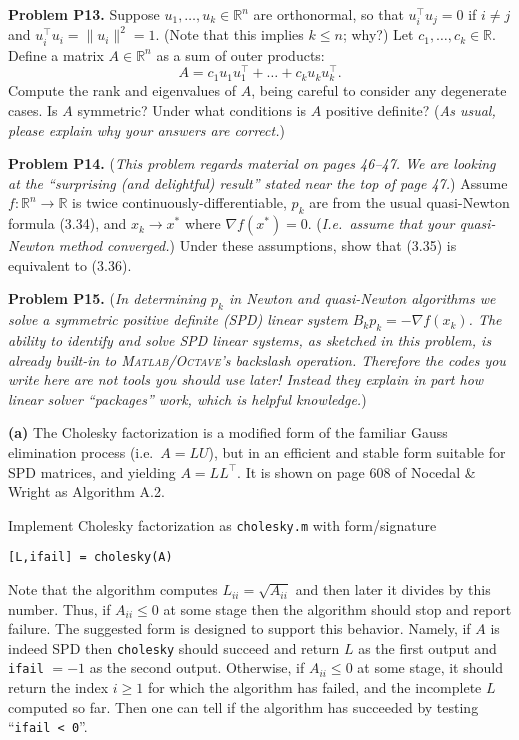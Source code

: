 \documentclass[12pt]{amsart}
\newcommand{\RR}{\mathbb{R}}
\newcommand{\grad}{\nabla}
\newcommand{\Matlab}{\textsc{Matlab}\xspace}
\newcommand{\Octave}{\textsc{Octave}\xspace}
\newcommand{\prob}[1]{\medskip\noindent\textbf{#1}\quad }
\newcommand{\epart}[1]{\medskip\noindent\textbf{(#1)}\quad }
\begin{document}
\prob{Problem P13.}  Suppose $u_1,\dots,u_k\in \RR^n$ are orthonormal, so that $u_i^\top u_j = 0$ if $i\ne j$ and $u_i^\top u_i = \|u_i\|^2 = 1$.  (Note that this implies $k\le n$; why?)  Let $c_1,\dots,c_k\in \RR$.  Define a matrix $A\in\RR^n$ as a sum of outer products:
    $$A = c_1 u_1 u_1^\top + \dots + c_k u_k u_k^\top.$$
Compute the rank and eigenvalues of $A$, being careful to consider any degenerate cases.  Is $A$ symmetric?  Under what conditions is $A$ positive definite?  (\emph{As usual, please explain why your answers are correct.})


\newpage
\prob{Problem P14.}  (\emph{This problem regards material on pages 46--47.  We are looking at the ``surprising (and delightful) result'' stated near the top of page 47.})  Assume $f:\RR^n\to \RR$ is twice continuously-differentiable, $p_k$ are from the usual quasi-Newton formula (3.34), and $x_k \to x^*$ where $\grad f(x^*)=0$. (\emph{I.e.~assume that your quasi-Newton method converged.})  Under these assumptions, show that (3.35) is equivalent to (3.36).  


\prob{Problem P15.}  (\emph{In determining $p_k$ in Newton and quasi-Newton algorithms we solve a symmetric positive definite (SPD) linear system $B_k p_k = - \grad f(x_k)$.  The ability to identify and solve SPD linear systems, as sketched in this problem, is already built-in to \Matlab/\Octave's backslash operation.  Therefore the codes you write here are not tools you should use later!  Instead they explain in part how linear solver ``packages'' work, which is helpful knowledge.})

\epart{a}  The Cholesky factorization is a modified form of the familiar Gauss elimination process (i.e.~$A=LU$), but in an efficient and stable form suitable for SPD matrices, and yielding $A=L L^\top$.  It is shown on page 608 of Nocedal \& Wright as Algorithm A.2.

Implement Cholesky factorization as \texttt{cholesky.m} with form/signature

\centerline{\texttt{[L,ifail] = cholesky(A)}}

\noindent  Note that the algorithm computes $L_{ii} = \sqrt{A_{ii}}$ and then later it divides by this number.  Thus, if $A_{ii}\le 0$ at some stage then the algorithm should stop and report failure.  The suggested form is designed to support this behavior.  Namely, if $A$ is indeed SPD then \texttt{cholesky} should succeed and return $L$ as the first output and \texttt{ifail} $=-1$ as the second output.  Otherwise, if $A_{ii}\le 0$ at some stage, it should return the index $i\ge 1$ for which the algorithm has failed, and the incomplete $L$ computed so far.  Then one can tell if the algorithm has succeeded by testing ``\texttt{ifail < 0}''.
\end{document}
